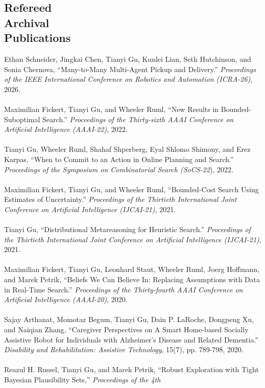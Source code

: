 \documentclass[margin, 10pt]{res} %
\begin{document}
\begin{resume}
\section{Refereed\\Archival\\Publications}
Ethan Schneider, Jingkai Chen, Tianyi Gu, Kunlei Lian, Seth Hutchinson, and Sonia Chernova, ``Many-to-Many Multi-Agent Pickup and Delivery.'' {\sl Proceedings of the IEEE International Conference on Robotics and Automation (ICRA-26)}, 2026.\\~\\
Maximilian Fickert, Tianyi Gu, and Wheeler Ruml, ``New Results in Bounded-Suboptimal Search.'' {\sl Proceedings of the Thirty-sixth AAAI Conference on Artificial Intelligence (AAAI-22)}, 2022.\\~\\
Tianyi Gu, Wheeler Ruml, Shahaf Shperberg, Eyal Shlomo Shimony, and Erez Karpas, ``When to Commit to an Action in Online Planning and Search.'' {\sl Proceedings of the Symposium on Combinatorial Search (SoCS-22}), 2022.\\~\\
Maximilian Fickert, Tianyi Gu, and Wheeler Ruml, ``Bounded-Cost Search Using Estimates of Uncertainty.'' {\sl Proceedings of the Thirtieth International Joint Conference on Artificial Intelligence (IJCAI-21)}, 2021.\\~\\
Tianyi Gu, ``Distributional Metareasoning for Heuristic Search.'' {\sl Proceedings of the Thirtieth International Joint Conference on Artificial Intelligence (IJCAI-21)}, 2021.\\~\\
Maximilian Fickert, Tianyi Gu, Leonhard Staut, Wheeler Ruml, Joerg Hoffmann, and Marek Petrik, ``Beliefs We Can Believe In: Replacing Assumptions with Data in Real-Time Search.'' {\sl Proceedings of the Thirty-fourth AAAI Conference on Artificial Intelligence (AAAI-20)}, 2020.\\~\\
Sajay Arthanat, Momotaz Begum, Tianyi Gu, Dain P. LaRoche, Dongpeng Xu, and Naiqian Zhang, ``Caregiver Perspectives on A Smart Home-based Socially Assistive Robot for Individuals with Alzheimer's Disease and Related Dementia.'' {\sl Disability and Rehabilitation: Assistive Technology}, 15(7), pp. 789-798, 2020.\\~\\
Reazul H. Russel, Tianyi Gu, and Marek Petrik, ``Robust Exploration
with Tight Bayesian Plausibility Sets,'' {\sl Proceedings of the 4th
}
\end{resume}
\end{document}
